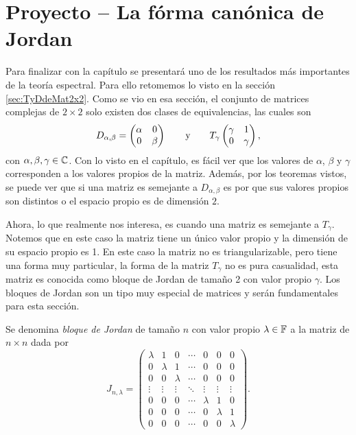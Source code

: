 \section{Proyecto -- La fórma canónica de Jordan}

Para finalizar con la capítulo se presentará uno de los resultados más importantes de la teoría espectral. Para ello retomemos lo visto en la sección \ref{sec:TyDdeMat2x2}. Como se vio en esa sección, el conjunto de matrices complejas de $2\times 2$ solo existen dos clases de equivalencias, las cuales son
\[
  D_{\alpha, \beta} = \begin{pmatrix}
    \alpha & 0 \\ 0 & \beta
  \end{pmatrix}
    \qquad\text{y}\qquad
  T_\gamma \begin{pmatrix}
      \gamma & 1 \\ 0 & \gamma
    \end{pmatrix},
\]
con $\alpha, \beta, \gamma \in \mathbb{C}$. Con lo visto en el capítulo, es fácil ver que los valores de $\alpha$, $\beta$ y $\gamma$ corresponden a los valores propios de la matriz. Además, por los teoremas vistos, se puede ver que si una matriz es semejante a $D_{\alpha, \beta}$ es por que sus valores propios son distintos o el espacio propio es de dimensión $2$.

Ahora, lo que realmente nos interesa, es cuando una matriz es semejante a $T_\gamma$. Notemos que en este caso la matriz tiene un único valor propio y la dimensión de su espacio propio es 1. En este caso la matriz no es triangularizable, pero tiene una forma muy particular, la forma de la matriz $T_\gamma$ no es pura casualidad, esta matriz es conocida como bloque de Jordan de tamaño 2 con valor propio $\gamma$. Los bloques de Jordan son un tipo muy especial de matrices y serán fundamentales para esta sección.

\begin{defi}
  Se denomina \emph{bloque de Jordan} de tamaño $n$ con valor propio $\lambda \in \mathbb{F}$ a la matriz de $n\times n$ dada por
    \[
      J_{n,\lambda} = \begin{pmatrix}
        \lambda & 1       & 0       & \cdots & 0       & 0       & 0       \\
        0       & \lambda & 1       & \cdots & 0       & 0       & 0       \\
        0       & 0       & \lambda & \cdots & 0       & 0       & 0       \\
        \vdots  & \vdots  & \vdots  & \ddots & \vdots  & \vdots  & \vdots  \\
        0       & 0       & 0       & \cdots & \lambda & 1       & 0       \\
        0       & 0       & 0       & \cdots & 0       & \lambda & 1       \\
        0       & 0       & 0       & \cdots & 0       & 0       & \lambda
      \end{pmatrix}.
    \]
\end{defi}

